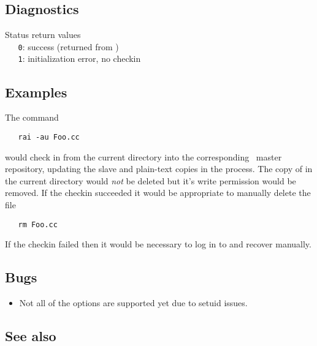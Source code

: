 \subsection*{Diagnostics}
 
Status return values
\\ \verb+   0+:  success (returned from )
\\ \verb+   1+:  initialization error, no checkin\\
 
\subsection*{Examples}
 
The command
 
\begin{verbatim}
   rai -au Foo.cc
\end{verbatim}
 
\noindent
would check in  from the current directory into the corresponding
\aipspp\ master repository, updating the slave and plain-text copies in the
process.  The copy of  in the current directory would \emph{not}
be deleted but it's write permission would be removed.  If the checkin
succeeded it would be appropriate to manually delete the file

\begin{verbatim}
   rm Foo.cc
\end{verbatim}
 
\noindent
If the checkin failed then it would be necessary to log in to
 and recover manually.

\subsection*{Bugs}

\begin{itemize}
\item
   Not all of the  options are supported yet due to setuid
   issues.
\end{itemize}

\subsection*{See also}

